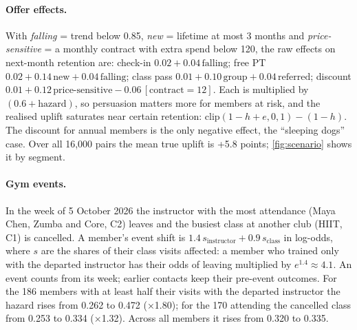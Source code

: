 \paragraph{Offer effects.} With \emph{falling} = trend below 0.85, \emph{new} = lifetime at most 3 months and \emph{price-sensitive} = a monthly contract with extra spend below 120, the raw effects on next-month retention are: check-in $0.02 + 0.04\,\text{falling}$; free PT $0.02 + 0.14\,\text{new} + 0.04\,\text{falling}$; class pass $0.01 + 0.10\,\text{group} + 0.04\,\text{referred}$; discount $0.01 + 0.12\,\text{price-sensitive} - 0.06\,[\text{contract}=12]$. Each is multiplied by $(0.6 + \text{hazard})$, so persuasion matters more for members at risk, and the realised uplift saturates near certain retention: $\text{clip}(1 - h + e, 0, 1) - (1 - h)$. The discount for annual members is the only negative effect, the \enquote{sleeping dogs} case. Over all 16,000 pairs the mean true uplift is +5.8 points; \cref{fig:scenario} shows it by segment.

\paragraph{Gym events.} In the week of 5 October 2026 the instructor with the most attendance (Maya Chen, Zumba and Core, C2) leaves and the busiest class at another club (HIIT, C1) is cancelled. A member's event shift is $1.4\,s_\text{instructor} + 0.9\,s_\text{class}$ in log-odds, where $s$ are the shares of their class visits affected: a member who trained only with the departed instructor has their odds of leaving multiplied by $e^{1.4} \approx 4.1$. An event counts from its week; earlier contacts keep their pre-event outcomes. For the 186 members with at least half their visits with the departed instructor the hazard rises from 0.262 to 0.472 (×1.80); for the 170 attending the cancelled class from 0.253 to 0.334 (×1.32). Across all members it rises from 0.320 to 0.335.

